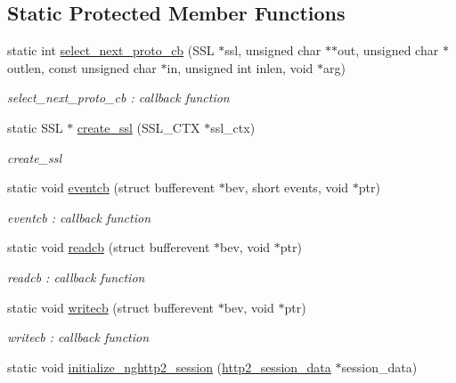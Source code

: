 \subsection*{Static Protected Member Functions}
\begin{DoxyCompactItemize}
\item 
static int \hyperlink{classNetwork_1_1HTTP2_1_1NgHTTP2API_af03f36272bba30d171567765cde46c86}{select\+\_\+next\+\_\+proto\+\_\+cb} (S\+SL $\ast$ssl, unsigned char $\ast$$\ast$out, unsigned char $\ast$outlen, const unsigned char $\ast$in, unsigned int inlen, void $\ast$arg)
\begin{DoxyCompactList}\small\item\em select\+\_\+next\+\_\+proto\+\_\+cb \+: callback function \end{DoxyCompactList}\item 
static S\+SL $\ast$ \hyperlink{classNetwork_1_1HTTP2_1_1NgHTTP2API_a3dba39aa33a1c629359d76a66d92ec0d}{create\+\_\+ssl} (S\+S\+L\+\_\+\+C\+TX $\ast$ssl\+\_\+ctx)
\begin{DoxyCompactList}\small\item\em create\+\_\+ssl \end{DoxyCompactList}\item 
static void \hyperlink{classNetwork_1_1HTTP2_1_1NgHTTP2API_a0356d7de7d3df4fa59b91610dcbaf5ef}{eventcb} (struct bufferevent $\ast$bev, short events, void $\ast$ptr)
\begin{DoxyCompactList}\small\item\em eventcb \+: callback function \end{DoxyCompactList}\item 
static void \hyperlink{classNetwork_1_1HTTP2_1_1NgHTTP2API_a9f3146f288f2fb033296b6e43564cc7b}{readcb} (struct bufferevent $\ast$bev, void $\ast$ptr)
\begin{DoxyCompactList}\small\item\em readcb \+: callback function \end{DoxyCompactList}\item 
static void \hyperlink{classNetwork_1_1HTTP2_1_1NgHTTP2API_a5d047441518239869e1c699323ee3c92}{writecb} (struct bufferevent $\ast$bev, void $\ast$ptr)
\begin{DoxyCompactList}\small\item\em writecb \+: callback function \end{DoxyCompactList}\item 
static void \hyperlink{classNetwork_1_1HTTP2_1_1NgHTTP2API_ac54322656bb0db60581bbcae17a18e1a}{initialize\+\_\+nghttp2\+\_\+session} (\hyperlink{structNetwork_1_1HTTP2_1_1http2__session__data}{http2\+\_\+session\+\_\+data} $\ast$session\+\_\+data)
$$
\end{DoxyCompactItemize}
